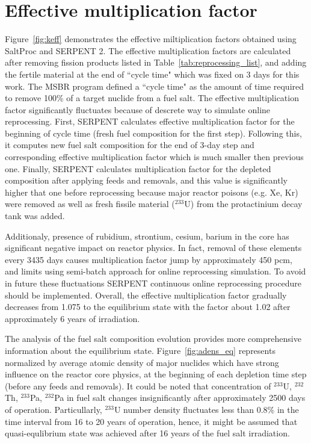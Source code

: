 \section{Effective multiplication factor}
Figure~\ref{fig:keff} demonstrates the effective miltiplication factors obtained using SaltProc and SERPENT 2. The effective multiplication factors are calculated after removing fission products listed in Table~\ref{tab:reprocessing_list}, and adding the fertile material at the end of ``cycle time" which was fixed on 3 days for this work. The \gls{MSBR} program defined a ``cycle time" as the amount of time required to remove 100\% of a target nuclide from a fuel salt. The effective multiplication factor significantly fluctuates because of descrete way to simulate online reprocessing. First, SERPENT calculates effective multiplication factor for the beginning of cycle time (fresh fuel composition for the first step). Following this, it computes new fuel salt composition for the end of 3-day step and corresponding effective multiplication factor which is much smaller then previous one. Finally, SERPENT calculates multiplication factor for the depleted composition after applying feeds and removals, and this value is significantly higher that one before reprocessing because major reactor poisons (e.g. Xe, Kr) were removed as well as fresh fissile material ($^{233}$U) from the protactinium decay tank was added. 

Additionaly, presence of rubidium, strontium, cesium, barium in the core has significant negative impact on reactor physics. In fact, removal of these elements every 3435 days causes multiplication factor jump by approximately 450 pcm, and limits using semi-batch approach for online reprocessing simulation. To avoid in future these fluctuations SERPENT continuous online reprocessing procedure should be implemented. Overall, the effective multiplication factor gradually decreases from 1.075 to the equilibrium state with the factor about 1.02 after approximately 6 years of irradiation. 

The analysis of the fuel salt composition evolution provides more comprehensive information about the equilibrium state. Figure~\ref{fig:adens_eq} represents normalized by average atomic density of major nuclides which have strong influence on the reactor core physics, at the beginning of each depletion time step (before any feeds and removals). It could be noted that concentration of $^{233}$U, $^{232}$Th, $^{233}$Pa, $^{232}$Pa in fuel salt changes insignificantly after approximately 2500 days of operation. Particullarly, $^{233}$U number density fluctuates less than 0.8\% in the time interval from 16 to 20 years of operation, hence, it might be assumed that quasi-equlibrium state was achieved after 16 years of the fuel salt irradiation.

